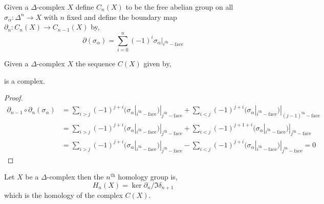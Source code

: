 \documentclass[12pt]{extarticle}
\begin{document}
\begin{definition}
Given a $\Delta$-complex $X$ define $C_n(X)$ to be the free abelian group on all $\sigma_\alpha : \Delta^n \to X$ with $n$ fixed and define the boundary map $\partial_n  : C_n(X) \to C_{n-1}(X)$ by, 
\[\partial(\sigma_\alpha) = \sum_{i = 0}^n (-1)^i \sigma_\alpha|_{i^{\mathrm{th}}-\text{face}} \]

\end{definition}

\begin{lemma}
Given a $\Delta$-complex $X$ the sequence $C(X)$ given by,
\begin{center}
\end{center}
is a complex.
\end{lemma}

\begin{proof}
\begin{align*} 
\partial_{n-1} \circ \partial_n(\sigma_\alpha) 
& = \sum_{i > j} (-1)^{j + i} (\sigma_\alpha|_{i^{\mathrm{th}}-\text{face}})|_{j^{\mathrm{th}}-\text{face}} + \sum_{i < j} (-1)^{j + i} (\sigma_\alpha|_{i^{\mathrm{th}}-\text{face}})|_{(j-1)^{\mathrm{th}}-\text{face}}
\\
& = \sum_{i > j} (-1)^{j + i} (\sigma_\alpha|_{i^{\mathrm{th}}-\text{face}})|_{j^{\mathrm{th}}-\text{face}} + \sum_{i < j} (-1)^{j + 1 + i} (\sigma_\alpha|_{i^{\mathrm{th}}-\text{face}})|_{j^{\mathrm{th}}-\text{face}}
\\
& = \sum_{i > j} (-1)^{j + i} (\sigma_\alpha|_{i^{\mathrm{th}}-\text{face}})|_{j^{\mathrm{th}}-\text{face}} - \sum_{i < j} (-1)^{j + i} (\sigma_\alpha|_{i^{\mathrm{th}}-\text{face}})|_{j^{\mathrm{th}}-\text{face}} = 0
\end{align*}
\end{proof}

\begin{definition}
Let $X$ be a $\Delta$-complex then the $n^{\mathrm{th}}$ homology group is,
\[ H_n(X) = \ker{\partial_n}/\Im{\delta_{n + 1}} \]
which is the homology of the complex $C(X)$. 
\end{definition}
\end{document}
